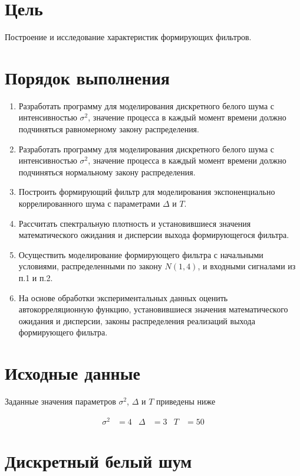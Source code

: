 \section*{Цель}

Построение и исследование характеристик формирующих фильтров.

\section*{Порядок выполнения}

\begin{enumerate}
    \item Разработать программу для моделирования дискретного белого шума с интенсивностью $\sigma^2$, значение
    процесса в каждый момент времени должно подчиняться равномерному закону распределения.
    \item Разработать программу для моделирования дискретного белого шума с интенсивностью $\sigma^2$, значение
    процесса в каждый момент времени должно подчиняться нормальному закону распределения.
    \item Построить формирующий фильтр для моделирования экспоненциально коррелированного шума с
    параметрами $\Delta$ и $T$.
    \item Рассчитать спектральную плотность и установившиеся значения математического ожидания и дисперсии выхода
    формирующегося фильтра.
    \item Осуществить моделирование формирующего фильтра с начальными условиями, распределенными по закону $N(1,4)$,
    и входными сигналами из п.1 и п.2.
    \item На основе обработки экспериментальных данных оценить автокорреляционную функцию, установившиеся значения
    математического ожидания и дисперсии, законы распределения реализаций выхода формирующего фильтра.
\end{enumerate}

\section*{Исходные данные}

Заданные значения параметров $\sigma^2$, $\Delta$ и $T$ приведены ниже

\begin{align*}
    \sigma^2 & = 4 & \Delta & = 3 & T & = 50
\end{align*}

\newpage

\section*{Дискретный белый шум}

